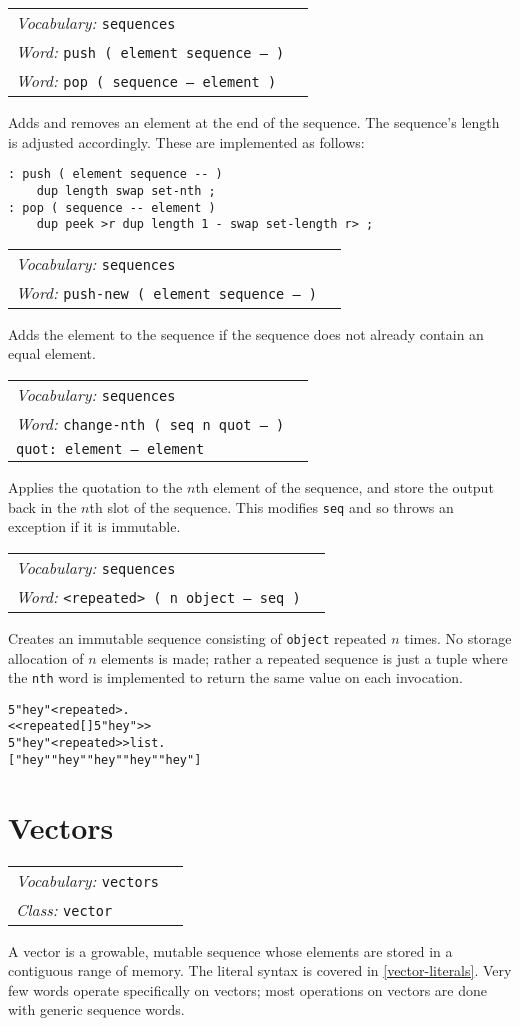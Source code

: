 \documentclass{book}
\newcommand{\vocabulary}[1]{\emph{Vocabulary:} \texttt{#1}&\\}
\newcommand{\ordinaryword}[2]{\index{\texttt{#1}}\emph{Word:} \texttt{#2}&\\}
\newcommand{\classword}[1]{\index{\texttt{#1}}\emph{Class:} \texttt{#1}&\\}
\newcommand{\wordtable}[1]{


\begin{tabularx}{12cm}{lX}
\hline
#1
\hline
\end{tabularx}

}
\begin{document}
\wordtable{
\vocabulary{sequences}
\ordinaryword{push}{push ( element sequence -- )}
\ordinaryword{pop}{pop ( sequence -- element )}
}

Adds and removes an element at the end of the sequence. The sequence's length is adjusted accordingly. These are implemented as follows:
\begin{verbatim}
: push ( element sequence -- )
    dup length swap set-nth ;
: pop ( sequence -- element )
    dup peek >r dup length 1 - swap set-length r> ;
\end{verbatim}

\wordtable{
\vocabulary{sequences}
\ordinaryword{push-new}{push-new ( element sequence -- )}
}

Adds the element to the sequence if the sequence does not already contain an equal element.

\wordtable{
\vocabulary{sequences}
\ordinaryword{change-nth}{change-nth ( seq n quot -- )}
\texttt{quot:~element -- element}\\
}
Applies the quotation to the $n$th element of the sequence, and store the output back in the $n$th slot of the sequence. This modifies \texttt{seq} and so throws an exception if it is immutable.
\wordtable{
\vocabulary{sequences}
\ordinaryword{<repeated>}{<repeated> ( n object -- seq )}
}
Creates an immutable sequence consisting of \verb|object| repeated $n$ times. No storage allocation of $n$ elements is made; rather a repeated sequence is just a tuple where the \verb|nth| word is implemented to return the same value on each invocation.
\begin{alltt}
  5 "hey" <repeated> .
<< repeated [ ] 5 "hey" >>
  5 "hey" <repeated> >list .
[ "hey" "hey" "hey" "hey" "hey" ]
\end{alltt}


\section{Vectors}\label{vectors}

\wordtable{
\vocabulary{vectors}
\classword{vector}
}
\vectorglos
A vector is a growable, mutable sequence whose elements are stored in a contiguous range of memory. The literal syntax is covered in \ref{vector-literals}. Very few words operate specifically on vectors; most operations on vectors are done with generic sequence words.
\end{document}
